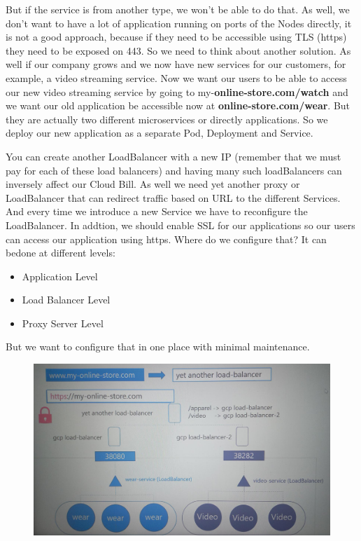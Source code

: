 \documentclass{article}
\begin{document}
But if the service is from another type, we won't be able to do that. As well, we don't want to have a lot of application running on ports of the Nodes directly, it is not a good approach, because if they need to be accessible
using TLS (https) they need to be exposed on 443. So we need to think about another solution.
As well if our company grows and we now have new services for our customers, 
for example, a video streaming service. 
Now we want our users to be able to access our new video 
streaming service by going to my-\textbf{online-store.com/watch} and we want our old application
be accessible now at \textbf{online-store.com/wear}. 
But they are actually two different microservices or directly applications.
So we deploy our new application as a separate Pod, Deployment and Service.

You can create another LoadBalancer with a new IP (remember that we must pay for each of these load balancers)
and having many such loadBalancers can inversely affect our Cloud Bill.
As well we need yet another proxy or LoadBalancer that can redirect traffic based on URL to the different Services. 
And every time we introduce a new Service we have to reconfigure the LoadBalancer. In addtion, we should enable SSL for our applications so our users can access our application using https. 
Where do we configure that? It can bedone at different levels: 

\begin{itemize}
    \item Application Level
    \item Load Balancer Level
    \item Proxy Server Level
\end{itemize}

But we want to configure that in one place with minimal maintenance.

\begin{figure}[H]
    \centering
    \includegraphics[width=\textwidth]{pictures/ingress7.png}
\end{figure}
\end{document}
